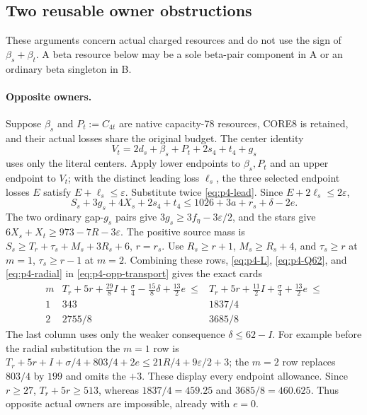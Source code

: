\documentclass[11pt,letterpaper]{article}
\theoremstyle{definition}\newtheorem{definition}[theorem]{Definition}
\begin{document}
\subsection{Two reusable owner obstructions}\label{subsec:p4-owner}
These arguments concern actual charged resources and do not use the sign
of $\beta_s+\beta_t$. A beta resource below may be a sole beta-pair
component in A or an ordinary beta singleton in B.

\paragraph{Opposite owners.}
Suppose $\beta_s$ and $P_t:=C_{4t}$ are native capacity-78 resources,
CORE8 is retained, and their actual losses share the original budget.
The center identity
\[
 V_t=2d_s+\beta_s+P_t+2s_4+t_4+g_s
\]
uses only the literal centers. Apply lower endpoints to $\beta_s,P_t$
and an upper endpoint to $V_t$; with the distinct leading loss $\ell_s$,
the three selected endpoint losses $E$ satisfy $E+\ell_s\le\varepsilon$.
Substitute twice \eqref{eq:p4-lead}. Since $E+2\ell_s\le2\varepsilon$,
\begin{equation}
 S_s+3g_s+4X_s+2s_4+t_4
 \le1026+3a+r_s+\delta-2e.                       \label{eq:p4-opp-transport}
\end{equation}
The two ordinary gap-$g_s$ pairs give
$3g_s\ge3f_\eta-3\varepsilon/2$, and the stars give
$6X_s+X_t\ge973-7R-3\varepsilon$.
The positive source mass is
$S_s\ge T_r+\tau_s+M_s+3R_s+6$, $r=r_s$.
Use $R_s\ge r+1$, $M_s\ge R_s+4$, and
$\tau_s\ge r$ at $m=1$, $\tau_s\ge r-1$ at $m=2$.
Combining these rows, \eqref{eq:p4-L}, \eqref{eq:p4-Q62}, and
\eqref{eq:p4-radial} in \eqref{eq:p4-opp-transport} gives the exact cards
\[
\begin{array}{c|c|c}
 m& T_r+5r+\frac{29}{8}I+\frac\sigma4-
 \frac{15}{8}\delta+\frac{13}{2}e\ \le&
 T_r+5r+\frac{11}{2}I+\frac\sigma4+\frac{13}{2}e\ \le\\\hline
 1&343&1837/4\\
 2&2755/8&3685/8
\end{array}                                                    \tag{P4-opp}
\]
The last column uses only the weaker consequence $\delta\le62-I$.
For example before the radial substitution the $m=1$ row is
$T_r+5r+I+\sigma/4+803/4+2e\le21R/4+9\varepsilon/2+3$;
the $m=2$ row replaces $803/4$ by $199$ and omits the $+3$.
These display every endpoint allowance. Since $r\ge27$,
$T_r+5r\ge513$, whereas $1837/4=459.25$ and $3685/8=460.625$.
Thus opposite actual owners are impossible, already with $e=0$.
\end{document}
